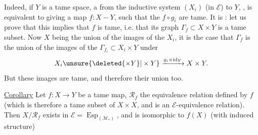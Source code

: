 Indeed, if $Y$ is a tame space, a   from the inductive system $(X_i)$ (in $\mathcal E$) to $Y$, , is equivalent to giving a map $f:X\mathbin{-}Y$, such that the $f\circ g_i$ are tame. It is  : let us prove that this implies that $f$ is tame, i.e. that its graph $\Gamma_f\subset X\times Y$ is a tame subset. Now $X$ being the union of the images of the $X_i$, it is the case that $\Gamma_f$ is the union of the images of the $\Gamma_{f_i}\subset X_i\times Y$ under
\[
 X_i\unsure{\deleted{\times Y}|\times Y}\xrightarrow{g_i\times\operatorname{id}_Y}X\times Y.
\]
But these images are tame, and therefore their union too.

\uline{Corollary} Let $f:X\longrightarrow Y$ be a tame map, $\mathcal R_f$ the equivalence relation defined by $f$ (which is therefore a tame subset of $X\times X$, and is an $\mathcal E$-equivalence relation). Then $X/\mathcal R_f$ exists in $\mathcal E=\operatorname{Esp}_{(\mathcal M_*)}$, and is  isomorphic to $f(X)$ (with induced structure)

